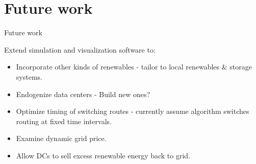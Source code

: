 \documentclass[xcolor=dvipsnames]{beamer}
\begin{document}
\section{Future work}

\summaryframe

\begin{frame}{Future work}

Extend simulation and visualization software to:

\begin{itemize}
\item Incorporate other kinds of renewables - tailor to local renewables \& storage systems.
\item Endogenize data centers - Build new ones? 
\item Optimize timing of switching routes - currently assume algorithm switches routing at fixed time intervals. 
\item Examine dynamic grid price.  
\item Allow DCs to sell excess renewable energy back to grid.
\end{itemize}

\end{frame}
\end{document}

